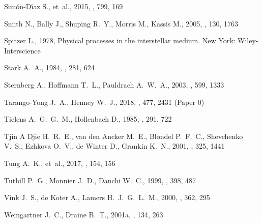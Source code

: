\documentclass[useAMS, usenatbib, a4paper]{mnras}
\begin{document}
\begin{thebibliography}{}
{Simón-D{\'{\i}}az} S.,  et~al., 2015, \apj, 799, 169

{Smith} N.,  {Bally} J.,  {Shuping} R.~Y.,  {Morris} M.,   {Kassis} M.,  2005,
  \aj, 130, 1763

{Spitzer} L.,  1978, {Physical processes in the interstellar medium}.
New York: Wiley-Interscience

{Stark} A.~A.,  1984, \apj, 281, 624

{Sternberg} A.,  {Hoffmann} T.~L.,   {Pauldrach} A.~W.~A.,  2003, \apj, 599,
  1333

{Tarango-Yong} J.~A.,  {Henney} W.~J.,  2018, \mnras, 477, 2431 (Paper 0)

{Tielens} A.~G.~G.~M.,  {Hollenbach} D.,  1985, \apj, 291, 722

{Tjin A Djie} H.~R.~E.,  {van den Ancker} M.~E.,  {Blondel} P.~F.~C.,
  {Shevchenko} V.~S.,  {Ezhkova} O.~V.,  {de Winter} D.,   {Grankin} K.~N.,
  2001, \mnras, 325, 1441

{Tung} A.~K.,  et~al., 2017, \aj, 154, 156

{Tuthill} P.~G.,  {Monnier} J.~D.,   {Danchi} W.~C.,  1999, \nat, 398, 487

{Vink} J.~S.,  {de Koter} A.,   {Lamers} H.~J.~G.~L.~M.,  2000, \aap, 362, 295

{Weingartner} J.~C.,  {Draine} B.~T.,  2001a, \apjs, 134, 263


\end{thebibliography}
\end{document}
